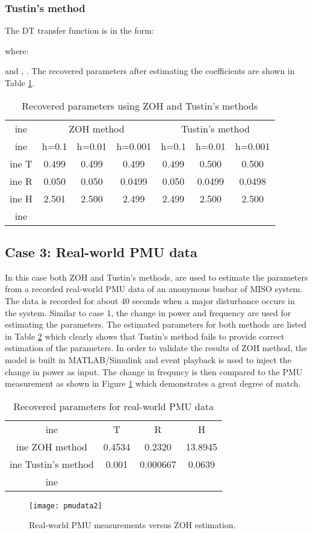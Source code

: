 \documentclass[10pt,journal,final]{IEEEtran}
\begin{document}
\subsubsection{{Tustin's method}} {The DT transfer function is in the form:

where:

and , . The recovered parameters after estimating the coefficients are shown in Table \ref{tab:angle}.}
\begin{table}[h]
\centering
\caption{Recovered parameters using ZOH and Tustin's methods}
\label{tab:angle}
\begin{tabular}{|c|c|c|c|c|c|c|}
ine
  & \multicolumn{3}{c|}{ZOH method} & \multicolumn{3}{c|}{{Tustin's method}} \\ ine
  & h=0.1    & h=0.01   & h=0.001   & {h=0.1}     & {h=0.01}     & {h=0.001}     \\ ine
T & 0.499    & 0.499    & 0.499     & {0.499}     & {0.500}      & {0.500}       \\ ine
R & 0.050    & 0.050    & 0.0499    & {0.050}     & {0.0499}     & {0.0498}      \\ ine
H & 2.501    & 2.500    & 2.499     & {2.499}     & {2.500}      & {2.500}       \\ ine
\end{tabular}
\end{table}
{
\subsection{Case 3: Real-world PMU data}
In this case both ZOH and Tustin's methods, are used to estimate the parameters from a recorded real-world PMU data of an anonymous busbar of MISO system. The data is recorded for about 40 seconds when a major disturbance occurs in the system. Similar to case 1, the change in power and frequency are used for estimating the parameters. The estimated parameters for both methods are listed in Table \ref{table:estimatedpmu} which clearly shows that Tustin's method fails to provide correct estimation of the parameters. In order to validate the results of ZOH method, the model is built in MATLAB/Simulink and event playback is used to inject the change in power as input. The change in frequncy is then compared to the PMU measurement as shown in Figure \ref{fig:rea} which demonstrates a great degree of match.}
\begin{table}[h]
\centering
\caption{Recovered parameters for real-world PMU data}
\label{table:estimatedpmu}
\begin{tabular}{|c|c|c|c|}
ine
                & T      & R        & H       \\ ine
ZOH method      & 0.4534 & 0.2320   & 13.8945 \\ ine
Tustin's method & 0.001  & 0.000667 & 0.0639  \\ ine
\end{tabular}
\end{table}
\begin{figure}[h!]
\centering
\texttt{[image: pmudata2]}
\caption{Real-world PMU measurements versus ZOH estimation.}
\label{fig:rea}
\end{figure}
\end{document}
